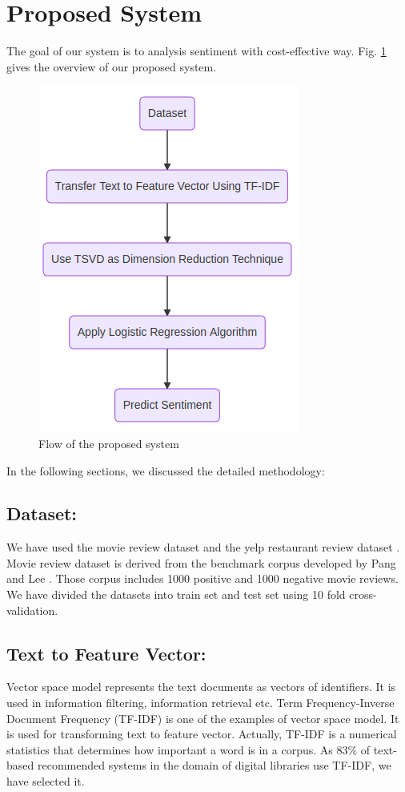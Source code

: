 \documentclass[10pt, conference]{IEEEtran}
\begin{document}
	\section{Proposed System}
The goal of our system is to analysis sentiment with cost-effective way. Fig. \ref{fig:flow} gives the overview of our proposed system.

\begin{figure}[H]
    \begin{center}
        \includegraphics[width = 0.191 \textheight]{flow.png}
    \end{center}
	\caption{Flow of the proposed system}
	\label{fig:flow}
\end{figure}
	
	In the following sections, we discussed the detailed methodology:
	
	\subsection{\textbf{Dataset:}} We have used the movie review dataset and the yelp restaurant review dataset \cite{b24}. Movie review dataset is derived from the benchmark corpus developed by Pang and Lee \cite{b18}. Those corpus includes 1000 positive and 1000 negative movie reviews. We have divided the datasets into train set and test set using 10 fold cross-validation.
	
	\subsection{\textbf{Text to Feature Vector: }} Vector space model represents the text documents as vectors of identifiers. It is used in information filtering, information retrieval etc. Term Frequency-Inverse Document Frequency (TF-IDF) \cite{b20} is one of the examples of vector space model. It is used for transforming text to feature vector. Actually, TF-IDF is a numerical statistics that determines how important a word is in a corpus. As 83\% of text-based recommended systems in the domain of digital libraries use TF-IDF, we have selected it.
	
\end{document}
